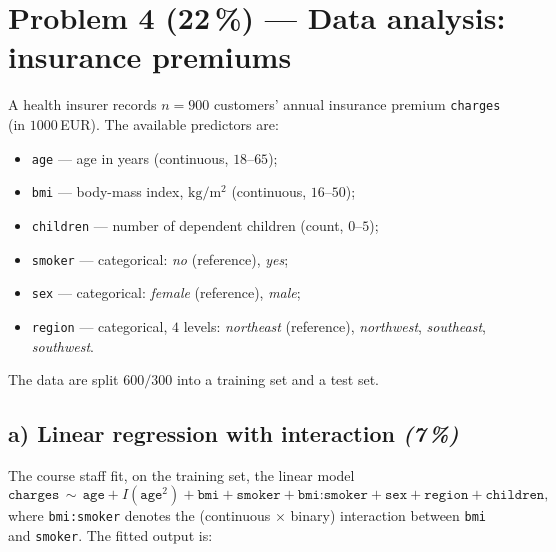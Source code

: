 \documentclass[11pt,a4paper]{article}
\newcommand{\points}[1]{\textbf{(#1\,\%)}}
\newcommand{\subpoints}[1]{\textit{(#1\,\%)}}
\begin{document}
\vfill\eject

\section*{Problem 4 \points{22} --- Data analysis: insurance premiums
}

A health insurer records $n = 900$ customers' annual insurance premium \texttt{charges} (in $1000$\,EUR). The available predictors are:
\begin{itemize}
  \item \texttt{age} --- age in years (continuous, $18$--$65$);
  \item \texttt{bmi} --- body-mass index, $\mathrm{kg}/\mathrm{m}^2$ (continuous, $16$--$50$);
  \item \texttt{children} --- number of dependent children (count, $0$--$5$);
  \item \texttt{smoker} --- categorical: \emph{no} (reference), \emph{yes};
  \item \texttt{sex} --- categorical: \emph{female} (reference), \emph{male};
  \item \texttt{region} --- categorical, $4$ levels: \emph{northeast} (reference), \emph{northwest}, \emph{southeast}, \emph{southwest}.
\end{itemize}

The data are split $600/300$ into a training set and a test set.

\subsection*{a) Linear regression with interaction \subpoints{7}}

The course staff fit, on the training set, the linear model
$$\texttt{charges} \,\sim\, \texttt{age} + I(\texttt{age}^2) + \texttt{bmi} + \texttt{smoker} + \texttt{bmi:smoker} + \texttt{sex} + \texttt{region} + \texttt{children},$$
where \texttt{bmi:smoker} denotes the (continuous $\times$ binary) interaction between \texttt{bmi} and \texttt{smoker}. The fitted output is:
\end{document}
